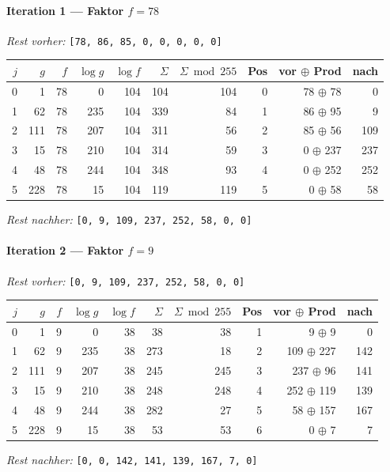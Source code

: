 \paragraph{Iteration 1 — Faktor $f = 78$}
\textit{Rest vorher:} \texttt{[78, 86, 85, 0, 0, 0, 0, 0]}\par
\begin{center}
\footnotesize
\setlength{\tabcolsep}{4pt}
\renewcommand{\arraystretch}{1.1}
\begin{tabular}{r|rr|rrrr|rrr}
\toprule
$j$ & $g$ & $f$ & $\log g$ & $\log f$ & $\Sigma$ & $\Sigma\bmod 255$ & Pos & vor $\oplus$ Prod & nach \\
\midrule
0 & 1 & 78 & 0 & 104 & 104 & 104 & 0 & 78 $\oplus$ 78 & 0 \\
1 & 62 & 78 & 235 & 104 & 339 & 84 & 1 & 86 $\oplus$ 95 & 9 \\
2 & 111 & 78 & 207 & 104 & 311 & 56 & 2 & 85 $\oplus$ 56 & 109 \\
3 & 15 & 78 & 210 & 104 & 314 & 59 & 3 & 0 $\oplus$ 237 & 237 \\
4 & 48 & 78 & 244 & 104 & 348 & 93 & 4 & 0 $\oplus$ 252 & 252 \\
5 & 228 & 78 & 15 & 104 & 119 & 119 & 5 & 0 $\oplus$ 58 & 58 \\
\bottomrule
\end{tabular}
\end{center}
\textit{Rest nachher:} \texttt{[0, 9, 109, 237, 252, 58, 0, 0]}\par\medskip
\paragraph{Iteration 2 — Faktor $f = 9$}
\textit{Rest vorher:} \texttt{[0, 9, 109, 237, 252, 58, 0, 0]}\par
\begin{center}
\footnotesize
\setlength{\tabcolsep}{4pt}
\renewcommand{\arraystretch}{1.1}
\begin{tabular}{r|rr|rrrr|rrr}
\toprule
$j$ & $g$ & $f$ & $\log g$ & $\log f$ & $\Sigma$ & $\Sigma\bmod 255$ & Pos & vor $\oplus$ Prod & nach \\
\midrule
0 & 1 & 9 & 0 & 38 & 38 & 38 & 1 & 9 $\oplus$ 9 & 0 \\
1 & 62 & 9 & 235 & 38 & 273 & 18 & 2 & 109 $\oplus$ 227 & 142 \\
2 & 111 & 9 & 207 & 38 & 245 & 245 & 3 & 237 $\oplus$ 96 & 141 \\
3 & 15 & 9 & 210 & 38 & 248 & 248 & 4 & 252 $\oplus$ 119 & 139 \\
4 & 48 & 9 & 244 & 38 & 282 & 27 & 5 & 58 $\oplus$ 157 & 167 \\
5 & 228 & 9 & 15 & 38 & 53 & 53 & 6 & 0 $\oplus$ 7 & 7 \\
\bottomrule
\end{tabular}
\end{center}
\textit{Rest nachher:} \texttt{[0, 0, 142, 141, 139, 167, 7, 0]}\par\medskip

